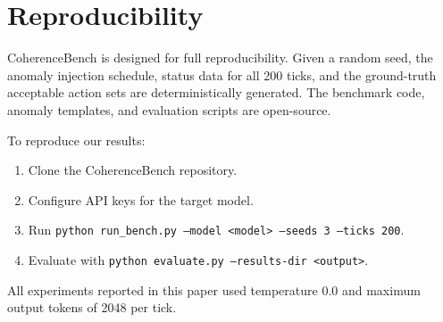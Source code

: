 \documentclass{article}
\begin{document}
\section{Reproducibility}
\label{app:reproducibility}

CoherenceBench is designed for full reproducibility. Given a random seed,
the anomaly injection schedule, status data for all 200 ticks, and the
ground-truth acceptable action sets are deterministically generated. The
benchmark code, anomaly templates, and evaluation scripts are
open-source.

To reproduce our results:
\begin{enumerate}
    \item Clone the CoherenceBench repository.
    \item Configure API keys for the target model.
    \item Run \texttt{python run\_bench.py --model <model> --seeds 3
    --ticks 200}.
    \item Evaluate with \texttt{python evaluate.py --results-dir
    <output>}.
\end{enumerate}

All experiments reported in this paper used temperature 0.0 and maximum
output tokens of 2048 per tick.
\end{document}
